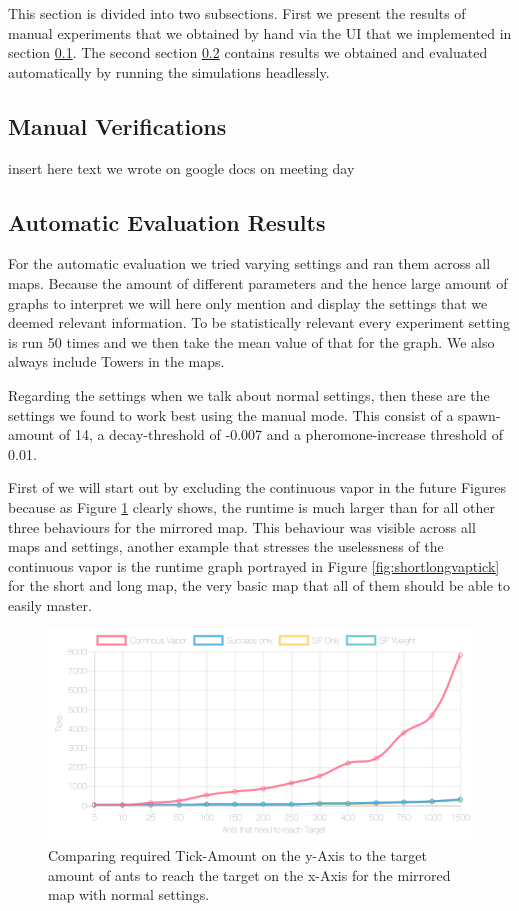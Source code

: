This section is divided into two subsections. First we present the results of manual experiments that we obtained by hand via the UI that we implemented in section \ref{sec:manualver}.
The second section \ref{sec:autover} contains results we obtained and evaluated automatically by running the simulations headlessly.

\subsection{Manual Verifications}
\label{sec:manualver}
insert here text we wrote on google docs on meeting day


\subsection{Automatic Evaluation Results}
\label{sec:autover}
For the automatic evaluation we tried varying settings and ran them across all maps. Because the amount of different parameters and the hence large amount of graphs to interpret we will here only mention and display the settings that we deemed relevant information. To be statistically relevant every experiment setting is run 50 times and we then take the mean value of that for the graph. We also always include Towers in the maps.

Regarding the settings when we talk about normal settings, then these are the settings we found to work best using the manual mode. This consist of a spawn-amount of 14, a decay-threshold of -0.007 and a pheromone-increase threshold of 0.01.

First of we will start out by excluding the continuous vapor in the future Figures because as Figure \ref{fig:mirrorvaptick} clearly shows, the runtime is much larger than for all other three behaviours for the mirrored map. This behaviour was visible across all maps and settings, another example that stresses the uselessness of the continuous vapor is the runtime graph portrayed in Figure \ref{fig:shortlongvaptick} for the short and long map, the very basic map that all of them should be able to easily master.

\begin{figure}[H]
  \centering
  \includegraphics[width=1\linewidth]{images/normalmirroredwithtower-ticks-line}
  \caption{Comparing required Tick-Amount on the y-Axis to the target amount of ants to reach the target on the x-Axis for the mirrored map with normal settings.}
  \label{fig:mirrorvaptick}
\end{figure}

